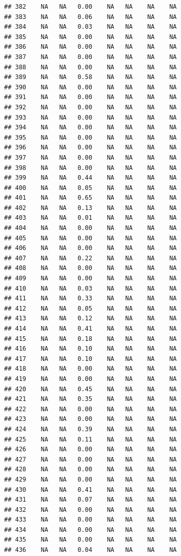 \documentclass{article}\usepackage{graphicx, color}
\makeatletter
\newenvironment{kframe}{%
 \def\at@end@of@kframe{}%
 \ifinner\ifhmode%
  \def\at@end@of@kframe{\end{minipage}}%
  \begin{minipage}{\columnwidth}%
 \fi\fi%
 \def\FrameCommand##1{\hskip\@totalleftmargin \hskip-\fboxsep
 \colorbox{shadecolor}{##1}\hskip-\fboxsep
     \hskip-\linewidth \hskip-\@totalleftmargin \hskip\columnwidth}%
 \MakeFramed {\advance\hsize-\width
   \@totalleftmargin\z@ \linewidth\hsize
   \@setminipage}}%
 {\par\unskip\endMakeFramed%
 \at@end@of@kframe}
\newenvironment{knitrout}{}{} %
\makeatother
\begin{document}
\begin{knitrout}
\begin{kframe}
\begin{verbatim}
## 382    NA   NA   0.00    NA   NA    NA    NA
## 383    NA   NA   0.06    NA   NA    NA    NA
## 384    NA   NA   0.03    NA   NA    NA    NA
## 385    NA   NA   0.00    NA   NA    NA    NA
## 386    NA   NA   0.00    NA   NA    NA    NA
## 387    NA   NA   0.00    NA   NA    NA    NA
## 388    NA   NA   0.00    NA   NA    NA    NA
## 389    NA   NA   0.58    NA   NA    NA    NA
## 390    NA   NA   0.00    NA   NA    NA    NA
## 391    NA   NA   0.00    NA   NA    NA    NA
## 392    NA   NA   0.00    NA   NA    NA    NA
## 393    NA   NA   0.00    NA   NA    NA    NA
## 394    NA   NA   0.00    NA   NA    NA    NA
## 395    NA   NA   0.00    NA   NA    NA    NA
## 396    NA   NA   0.00    NA   NA    NA    NA
## 397    NA   NA   0.00    NA   NA    NA    NA
## 398    NA   NA   0.00    NA   NA    NA    NA
## 399    NA   NA   0.44    NA   NA    NA    NA
## 400    NA   NA   0.05    NA   NA    NA    NA
## 401    NA   NA   0.65    NA   NA    NA    NA
## 402    NA   NA   0.13    NA   NA    NA    NA
## 403    NA   NA   0.01    NA   NA    NA    NA
## 404    NA   NA   0.00    NA   NA    NA    NA
## 405    NA   NA   0.00    NA   NA    NA    NA
## 406    NA   NA   0.00    NA   NA    NA    NA
## 407    NA   NA   0.22    NA   NA    NA    NA
## 408    NA   NA   0.00    NA   NA    NA    NA
## 409    NA   NA   0.00    NA   NA    NA    NA
## 410    NA   NA   0.03    NA   NA    NA    NA
## 411    NA   NA   0.33    NA   NA    NA    NA
## 412    NA   NA   0.05    NA   NA    NA    NA
## 413    NA   NA   0.12    NA   NA    NA    NA
## 414    NA   NA   0.41    NA   NA    NA    NA
## 415    NA   NA   0.18    NA   NA    NA    NA
## 416    NA   NA   0.10    NA   NA    NA    NA
## 417    NA   NA   0.10    NA   NA    NA    NA
## 418    NA   NA   0.00    NA   NA    NA    NA
## 419    NA   NA   0.00    NA   NA    NA    NA
## 420    NA   NA   0.45    NA   NA    NA    NA
## 421    NA   NA   0.35    NA   NA    NA    NA
## 422    NA   NA   0.00    NA   NA    NA    NA
## 423    NA   NA   0.00    NA   NA    NA    NA
## 424    NA   NA   0.39    NA   NA    NA    NA
## 425    NA   NA   0.11    NA   NA    NA    NA
## 426    NA   NA   0.00    NA   NA    NA    NA
## 427    NA   NA   0.00    NA   NA    NA    NA
## 428    NA   NA   0.00    NA   NA    NA    NA
## 429    NA   NA   0.00    NA   NA    NA    NA
## 430    NA   NA   0.41    NA   NA    NA    NA
## 431    NA   NA   0.07    NA   NA    NA    NA
## 432    NA   NA   0.00    NA   NA    NA    NA
## 433    NA   NA   0.00    NA   NA    NA    NA
## 434    NA   NA   0.00    NA   NA    NA    NA
## 435    NA   NA   0.00    NA   NA    NA    NA
## 436    NA   NA   0.04    NA   NA    NA    NA

\end{verbatim}
\end{kframe}
\end{knitrout}
\end{document}
